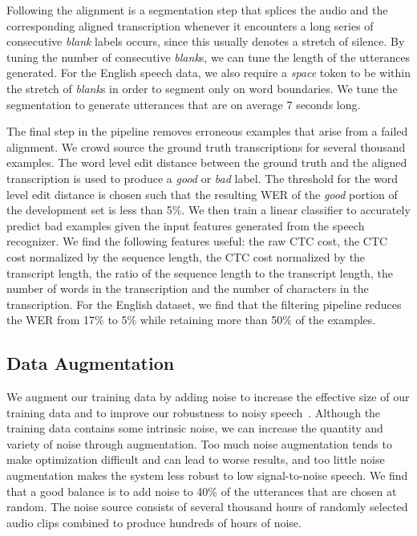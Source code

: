 \documentclass{article}
\begin{document}
Following the alignment is a segmentation step that splices the audio and the corresponding aligned transcription whenever it encounters a long series of consecutive \emph{blank} labels occurs, since this usually denotes a stretch of silence. By tuning the number of consecutive \emph{blank}s, we can tune the length of the utterances generated. For the English speech data, we also require a \emph{space} token to be within the stretch of \emph{blank}s in order to segment only on word boundaries. We tune the segmentation to generate utterances that are on average 7 seconds long.

The final step in the pipeline removes erroneous examples that arise from a failed alignment. We crowd source the ground truth transcriptions for several thousand examples. The word level edit distance between the ground truth and the aligned transcription is used to produce a \emph{good} or \emph{bad} label. The threshold for the word level edit distance is chosen such that the resulting WER of the \emph{good} portion of the development set is less than 5\%. We then train a linear classifier to accurately predict bad examples given the input features generated from the speech recognizer. We find the following features useful: the raw CTC cost, the CTC cost normalized by the sequence length, the CTC cost normalized by the transcript length, the ratio of the sequence length to the transcript length, the number of words in the transcription and the number of characters in the transcription. For the English dataset, we find that the filtering pipeline reduces the WER from 17\% to 5\% while retaining more than 50\% of the examples.

\subsection{Data Augmentation}
\label{subsection:noisesynth}

We augment our training data by adding noise to increase the effective size of our training data and to improve our robustness to noisy speech~\cite{hannun2014deepspeech}. Although the training data contains some intrinsic noise, we can increase the quantity and variety of noise through augmentation. Too much noise augmentation tends to make optimization difficult and can lead to worse results, and too little noise augmentation makes the system less robust to low signal-to-noise speech.  We find that a good balance is to add noise to 40\% of the utterances that are chosen at random. The noise source consists of several thousand hours of randomly selected audio clips combined to produce hundreds of hours of noise.
\end{document}
